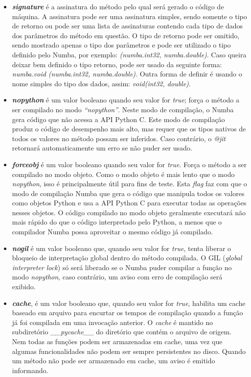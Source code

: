 \documentclass[
	12pt,				%
	openright,			%
	twoside,			%
	a4paper,			%
	english,			%
	french,				%
	spanish,			%
	brazil				%
	]{abntex2}
\begin{document}
\begin{itemize}
	\item \textbf{\textit{signature}} é a assinatura do método pelo qual será gerado o código de máquina. A assinatura pode ser uma assinatura simples, sendo somente o tipo de retorno ou pode ser uma lista de assinaturas contendo cada tipo de dados dos parâmetros do método em questão. O tipo de retorno pode ser omitido, sendo mostrado apenas o tipo dos parâmetros e pode ser utilizado o tipo definido pelo Numba, por exemplo: \textit{(numba.int32, numba.double)}. Caso queira deixar bem definido o tipo retorno, pode ser usado da seguinte forma:\textit{ numba.void (numba.int32, numba.double)}. Outra forma de definir é usando o nome simples do tipo dos dados, assim: \textit{void(int32, double)}.
	
	\item \textbf{\textit{nopython}} é um valor booleano quando seu valor for \textit{true}; força o método a ser compilado no modo \textit{“nopython”}. Neste modo de compilação, o Numba gera código que não acessa a API Python C. Este modo de compilação produz o código de desempenho mais alto, mas requer que os tipos nativos de todos os valores no método possam ser inferidos. Caso contrário, o \textit{@jit} retornará automaticamente um erro se não puder ser usado.
	
	\item \textbf{\textit{forceobj}} é um valor booleano quando seu valor for \textit{true}. Força o método a ser compilado no modo objeto. Como o modo objeto é mais lento que o modo \textit{nopython}, isso é principalmente útil para fins de teste. Esta \textit{flag} faz com que o modo de compilação Numba que gera o código que manipula todos os valores como objetos Python e usa a API Python C para executar todas as operações nesses objetos. O código compilado no modo objeto geralmente executará não mais rápido do que o código interpretado pelo Python, a menos que o compilador Numba possa aproveitar o mesmo código já compilado.
	
	\item \textbf{\textit{nogil}} é um valor booleano que, quando seu valor for \textit{true}, tenta liberar o bloqueio de interpretação global dentro do método compilada. O GIL (\textit{global interpreter lock}) só será liberado se o Numba puder compilar a função no modo \textit{nopython}, caso contrário, um aviso com erro de compilação será exibido.
	
	\item \textbf{\textit{cache}}, é um valor booleano que, quando seu valor for \textit{true}, habilita um cache baseado em arquivo para encurtar os tempos de compilação quando a função já foi compilada em uma invocação anterior. O \textit{cache} é mantido no subdiretório \textit{\_\_pycache\_\_} do diretório que contém o arquivo de origem. Nem todas as funções podem ser armazenadas em cache, uma vez que algumas funcionalidades não podem ser sempre persistentes no disco. Quando um método não pode ser armazenado em cache, um aviso é emitido informando.
	

\end{itemize}
\end{document}

